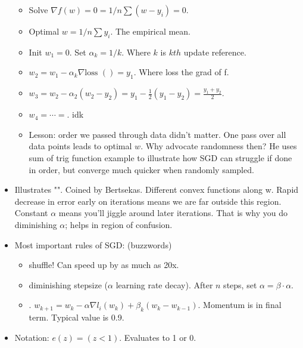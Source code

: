\documentclass[12pt]{article}
\begin{document}
\begin{itemize}
\begin{itemize}
		\item Solve $\nabla f(w) = 0 = 1/n \sum (w - y_i) = 0$.
		\item Optimal $w = 1/n \sum y_i $. The empirical mean.
		\item Init $w_1 = 0$. Set $\alpha_k = 1/k$. Where $k$ is $kth$ update reference.
		\item $w_2 = w_1 - \alpha_k \nabla \text{loss }() = y_1$. Where loss the grad of f.
		\item $w_3 = w_2 - \alpha_2 (w_2 - y_2) = y_1 -\frac{1}{2}(y_1 - y_2) = \frac{y_1 + y_2}{2}$.
		\item $w_4 = \cdots = $. idk
		\item Lesson: order we passed through data didn't matter. One pass over all data points leads to optimal $w$. Why advocate randomness then? He uses sum of trig function example to illustrate how SGD can struggle if done in order, but converge much quicker when randomly sampled.
	\end{itemize}
	\item Illustrates "". Coined by Bertsekas. Different convex functions along w. Rapid decrease in error early on iterations means we are far outside this region. Constant $\alpha$ means you'll jiggle around later iterations. That is why you do diminishing $\alpha$; helps in region of confusion.
	\item Most important rules of SGD: (buzzwords)
	\begin{itemize}
		\item shuffle! Can speed up by as much as 20x.
		\item diminishing stepsize ($\alpha$ learning rate decay). After $n$ steps, set $\alpha = \beta \cdot \alpha$.
		\item {}. $w_{k+1} = w_k - \alpha \nabla l_i(w_k) + \beta_k (w_k - w_{k-1})$. Momentum is in final term. Typical value is 0.9.
	\end{itemize}
	\item Notation: $e(z) = (z < 1)$. Evaluates to 1 or 0.
\end{itemize}
\end{document}
